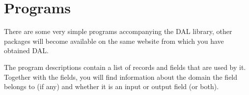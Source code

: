 \documentclass[a4paper]{book}
\newcommand{\printprogram}[1]{{\tt #1}\index{#1}}
\newcommand{\iris}{{\tt iris.ddl}\index{iris.ddl}}
\newcommand{\psed}{\printprogram{sed}}
\newcommand{\pawk}{\printprogram{awk}}
\begin{document}
\begin{comment}

\section{Exercises}

These exercises are meant to train you in getting familar with the programs,
however, solving the exercises also requires the usage of other standard UNIX
tools like \psed\ or \pawk.

\begin{enumerate}
  
\item Select randomly 15 records from the IRIS dataset, such that every flower
  is equally likely in the subsampled set.
  
  {\sl Thus, we need 5 records Versicolor, 5 records .... We build a
    hierarchical dataset using group and then sample within each group.

 \iris\   sample "data[,]<irish.ddl data/value:c" 
 }

\item Write a script to subsample the \iris\ dataset 200 times and evaluate
  how many samples are necessary to get a prediction rate of at least 90\% for
  the complete \ciris\ dataset, if you use the subsampling as input for the
  nearest neighbor classifier.

sample
nnc
freq
sed 'rate' | ... 
hist

\end{enumerate}



\end{comment}

\chapter{Programs}

There are some very simple programs accompanying the DAL library, other
packages will become available on the same website from which you have
obtained DAL.

The program descriptions contain a list of records and fields that are used by
it. Together with the fields, you will find information about the domain the
field belongs to (if any) and whether it is an input or output field (or
both).

\newpage
\newpage
\newpage
\newpage
\newpage
\newpage


\newpage
{}
\printindex


\end{document}
